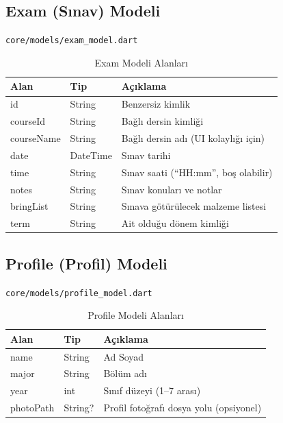 \documentclass[12pt,a4paper]{article}
\begin{document}
\subsection{Exam (Sınav) Modeli}
\texttt{core/models/exam\_model.dart}

\begin{table}[H]
    \centering
    \caption{Exam Modeli Alanları}
    \label{tab:exam}
    \renewcommand{\arraystretch}{1.3}
    \begin{tabularx}{\textwidth}{>{\ttfamily}l l X}
        \toprule
        \normalfont\textbf{Alan} & \textbf{Tip} & \textbf{Açıklama} \\
        \midrule
        id         & String   & Benzersiz kimlik \\
        courseId   & String   & Bağlı dersin kimliği \\
        courseName & String   & Bağlı dersin adı (UI kolaylığı için) \\
        date       & DateTime & Sınav tarihi \\
        time       & String   & Sınav saati (``HH:mm'', boş olabilir) \\
        notes      & String   & Sınav konuları ve notlar \\
        bringList  & String   & Sınava götürülecek malzeme listesi \\
        term       & String   & Ait olduğu dönem kimliği \\
        \bottomrule
    \end{tabularx}
\end{table}

\subsection{Profile (Profil) Modeli}
\texttt{core/models/profile\_model.dart}

\begin{table}[H]
    \centering
    \caption{Profile Modeli Alanları}
    \label{tab:profile}
    \renewcommand{\arraystretch}{1.3}
    \begin{tabularx}{\textwidth}{>{\ttfamily}l l X}
        \toprule
        \normalfont\textbf{Alan} & \textbf{Tip} & \textbf{Açıklama} \\
        \midrule
        name      & String  & Ad Soyad \\
        major     & String  & Bölüm adı \\
        year      & int     & Sınıf düzeyi (1--7 arası) \\
        photoPath & String? & Profil fotoğrafı dosya yolu (opsiyonel) \\
        \bottomrule
    \end{tabularx}
\end{table}
\end{document}
